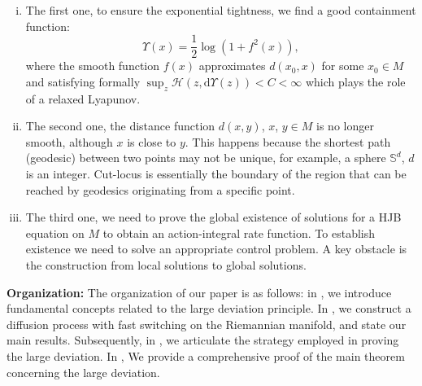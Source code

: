 \documentclass[a4paper]{article}
\numberwithin{equation}{section}
\theoremstyle{definition}
\begin{document}
\begin{enumerate}[(i)]
    \item The first one, to ensure the exponential tightness, we find a good containment function:
    \begin{equation*}
\Upsilon(x)=\frac{1}{2}\log(1+f^2(x)), 
\end{equation*}
where the smooth function $f(x)$ approximates $d(x_0,x)$ for some $x_0\in M$ and satisfying formally $\sup _z \mathcal{H}(z,\mathrm{d}\Upsilon(z))<C<\infty$ which plays the role of a relaxed Lyapunov. 
 \item The second one, the distance function $d(x,y)$, $x$, $y\in M$ is no longer smooth, although $x$ is close to $y$. This happens because the shortest path (geodesic) between two points may not be unique, for example, a sphere $\mathbb{S}^d$, $d$ is an integer. Cut-locus is essentially the boundary of the region that can be reached by geodesics originating from a specific point. 
    \item The third one, we need to prove the global existence of solutions for a HJB equation on $M$ to obtain an action-integral rate function. To establish existence we need to solve an appropriate control problem. A key obstacle is the construction from local solutions to global solutions.
\end{enumerate}
\par
\textbf{Organization:}
The organization of our paper is as follows:
in , we introduce fundamental concepts related to the large deviation principle.
In , we construct a diffusion process with fast switching on the Riemannian manifold, and state our main results. Subsequently, in , we articulate the strategy employed in proving the large deviation. In , We provide a comprehensive proof of the main theorem concerning the large deviation.
\end{document}
